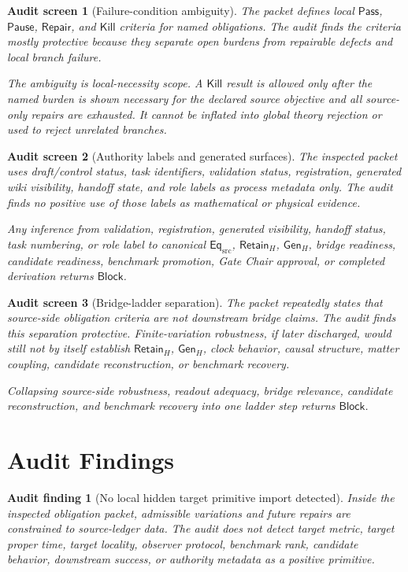 \documentclass[11pt]{article}
\newcommand{\EqSrc}{\mathsf{Eq}_{\mathrm{src}}}
\newcommand{\RetainH}{\mathsf{Retain}_{H}}
\newcommand{\GenH}{\mathsf{Gen}_{H}}
\newcommand{\Pass}{\mathsf{Pass}}
\newcommand{\Block}{\mathsf{Block}}
\newcommand{\Pause}{\mathsf{Pause}}
\newcommand{\Repair}{\mathsf{Repair}}
\newcommand{\Kill}{\mathsf{Kill}}
\newtheorem{screen}{Audit screen}
\newtheorem{auditfinding}{Audit finding}
\begin{document}
\begin{screen}[Failure-condition ambiguity]
The packet defines local \(\Pass\), \(\Pause\), \(\Repair\), and
\(\Kill\) criteria for named obligations. The audit finds the criteria
mostly protective because they separate open burdens from repairable
defects and local branch failure.

The ambiguity is local-necessity scope. A \(\Kill\) result is allowed
only after the named burden is shown necessary for the declared source
objective and all source-only repairs are exhausted. It cannot be
inflated into global theory rejection or used to reject unrelated
branches.
\end{screen}

\begin{screen}[Authority labels and generated surfaces]
The inspected packet uses draft/control status, task identifiers,
validation status, registration, generated wiki visibility, handoff
state, and role labels as process metadata only. The audit finds no
positive use of those labels as mathematical or physical evidence.

Any inference from validation, registration, generated visibility,
handoff status, task numbering, or role label to canonical \(\EqSrc\),
\(\RetainH\), \(\GenH\), bridge readiness, candidate readiness,
benchmark promotion, Gate Chair approval, or completed derivation
returns \(\Block\).
\end{screen}

\begin{screen}[Bridge-ladder separation]
The packet repeatedly states that source-side obligation criteria are
not downstream bridge claims. The audit finds this separation
protective. Finite-variation robustness, if later discharged, would
still not by itself establish \(\RetainH\), \(\GenH\), clock behavior,
causal structure, matter coupling, candidate reconstruction, or
benchmark recovery.

Collapsing source-side robustness, readout adequacy, bridge relevance,
candidate reconstruction, and benchmark recovery into one ladder step
returns \(\Block\).
\end{screen}

\section{Audit Findings}

\begin{auditfinding}[No local hidden target primitive import detected]
Inside the inspected obligation packet, admissible variations and
future repairs are constrained to source-ledger data. The audit does
not detect target metric, target proper time, target locality, observer
protocol, benchmark rank, candidate behavior, downstream success, or
authority metadata as a positive primitive.
\end{auditfinding}
\end{document}
